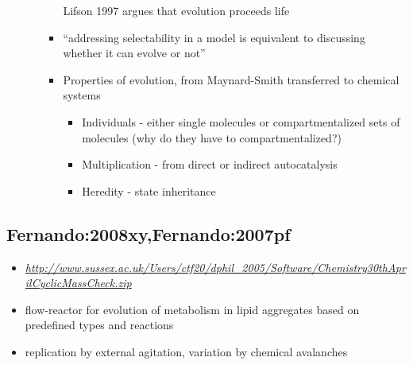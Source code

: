 \begin{itemize}
\begin{itemize}
\begin{itemize}
					Lifson 1997 argues that evolution proceeds life
					
					\item
					
					``addressing selectability in a model is equivalent to discussing
					whether it can evolve or not''
					
					\item
					
					Properties of evolution, from Maynard-Smith transferred to
					chemical systems
					
					
					\begin{itemize}
						\item
						
						Individuals - either single molecules or compartmentalized sets
						of molecules (why do they have to compartmentalized?)
						
						\item
						
						Multiplication - from direct or indirect autocatalysis
						
						\item
						
						Heredity - state inheritance
						
					\end{itemize}
				\end{itemize}
			\end{itemize}
		\end{itemize}
		
		\hypertarget{fernando2008xyfernando2007pf}{\subsection{Fernando:2008xy,Fernando:2007pf
			}\label{fernando2008xyfernando2007pf}}
		
		\begin{itemize}
			\item
			
			\href{http://www.sussex.ac.uk/Users/ctf20/dphil_2005/Software/Chemistry30thAprilCyclicMassCheck.zip}{\emph{http://www.sussex.ac.uk/Users/ctf20/dphil\_2005/Software/Chemistry30thAprilCyclicMassCheck.zip}}
			
			\item
			
			flow-reactor for evolution of metabolism in lipid aggregates based on
			predefined types and reactions
			
			\item
			
			replication by external agitation, variation by chemical avalanches
			
		\end{itemize}
		
